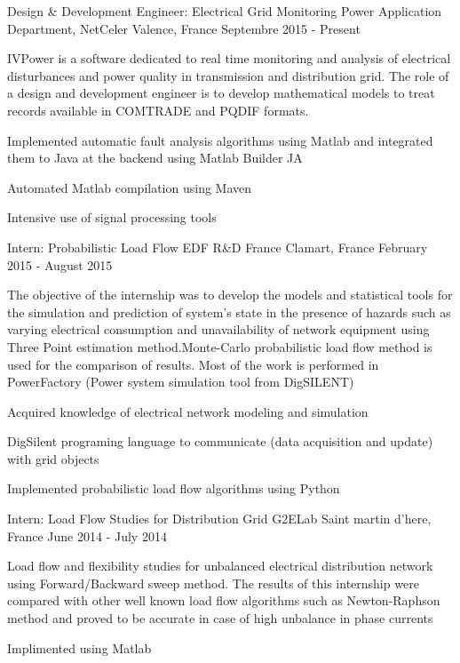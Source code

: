 
\begin{cventries}

\cventry
{Design \& Development Engineer: Electrical Grid Monitoring}
{Power Application Department, NetCeler}
{Valence, France}
{Septembre 2015 - Present}
{
\begin{cvitems}
\item {IVPower is a  software dedicated to real time monitoring and analysis of electrical disturbances and power quality in transmission and distribution grid. The role of a design and development engineer is to develop mathematical models to treat records available in COMTRADE and PQDIF formats.}
\item {Implemented automatic fault analysis algorithms using Matlab and integrated them to Java at the backend using Matlab Builder JA}
\item {Automated Matlab compilation using Maven}
\item {Intensive use of signal processing tools}
\end{cvitems}
}

\cventry
{Intern: Probabilistic Load Flow}
{EDF R\&D France}
{Clamart, France}
{February 2015 - August 2015}
{
\begin{cvitems}
\item {The objective of the internship was to develop the models and statistical tools
for the simulation and prediction of system's state in the presence of hazards such as varying electrical consumption and unavailability of network equipment using Three Point estimation method.Monte-Carlo probabilistic load flow method is used for the comparison of results. Most of the work is performed in PowerFactory (Power system simulation tool from DigSILENT)}
\item {Acquired knowledge of electrical network modeling and simulation}
\item {DigSilent programing language to communicate (data acquisition and update) with grid objects}
\item {Implemented probabilistic load flow algorithms using Python}
\end{cvitems}
}

\cventry
{Intern: Load Flow Studies for Distribution Grid}
{G2ELab}
{Saint martin d'here, France}
{June 2014 - July 2014}
{%
\begin{cvitems}
\item {Load flow and flexibility studies for unbalanced electrical distribution network using Forward/Backward sweep method. The results of this internship were compared with other well known load flow algorithms such as Newton-Raphson method and proved to be accurate in case of high unbalance in phase currents}
\item {Implimented using Matlab}
\end{cvitems} 
}


\end{cventries}
